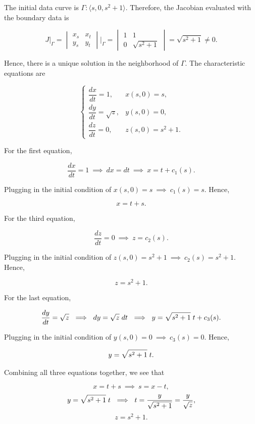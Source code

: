 \documentclass{article}
\begin{document}
\begin{flushleft}
The initial data curve is $\Gamma: \langle s,0,s^2+1 \rangle$. Therefore, the Jacobian evaluated with the boundary data is

$$J\Bigg|_\Gamma=\begin{vmatrix}
x_s & x_t \\
y_s & y_t
\end{vmatrix}\Bigg|_\Gamma=\begin{vmatrix}
1 & 1 \\
0 & \sqrt{s^2+1}
\end{vmatrix}=\sqrt{s^2+1} \neq 0.$$

Hence, there is a unique solution in the neighborhood of $\Gamma$. The characteristic equations are 

\[ \begin{cases} 
      \dfrac{dx}{dt}=1, &  x(s,0)=s, \\[1em]
      \dfrac{dy}{dt}=\sqrt{z}, & y(s,0)=0, \\[1em] 
      \dfrac{dz}{dt}=0, & z(s,0)=s^2+1.
   \end{cases}
\]

For the first equation,

$$\frac{dx}{dt}=1 ~\implies~ dx = dt ~\implies~ x=t+c_1(s).$$

Plugging in the initial condition of $ x(s,0)=s ~\implies~  c_1(s)=s$. Hence,

$$x=t+s.$$

For the third equation,

$$\frac{dz}{dt}=0 ~\implies~ z=c_2(s).$$

Plugging in the initial condition of $ z(s,0)=s^2+1 ~\implies~  c_2(s)=s^2+1$. Hence,

$$z=s^2+1.$$

For the last equation,

$$\frac{dy}{dt}=\sqrt{z} ~\implies~ dy = \sqrt{z}\hspace{1mm}dt ~\implies~ y=\sqrt{s^2+1}\hspace{1mm}t+c_3(s).$$

Plugging in the initial condition of $ y(s,0)=0 ~\implies~  c_3(s)=0$. Hence,

$$y=\sqrt{s^2+1}\hspace{1mm}t.$$

Combining all three equations together, we see that

$$x=t+s ~\implies~ s = x-t,$$
$$y=\sqrt{s^2+1}\hspace{1mm}t ~\implies~ t=\frac{y}{\sqrt{s^2+1}}=\frac{y}{\sqrt{z}} ,$$
$$z=s^2+1.$$


\end{flushleft}
\end{document}
